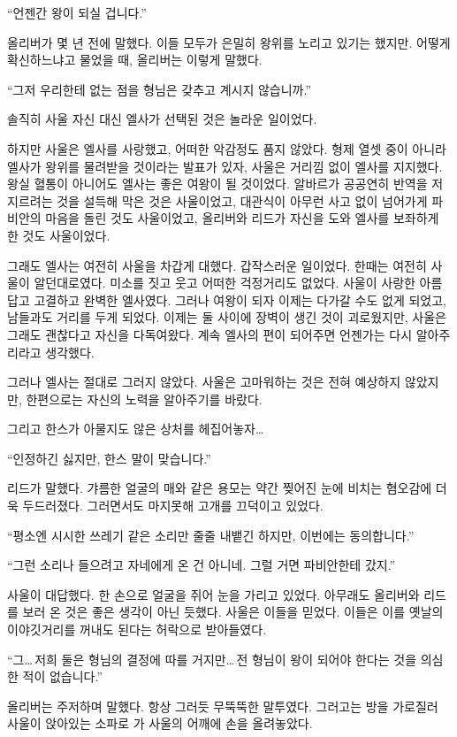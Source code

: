 ``언젠간 왕이 되실 겁니다.''

올리버가 몇 년 전에 말했다. 이들 모두가 은밀히 왕위를 노리고 있기는 했지만. 어떻게 확신하느냐고 물었을 때, 올리버는 이렇게 말했다.

``그저 우리한테 없는 점을 형님은 갖추고 계시지 않습니까.''

솔직히 사울 자신 대신 엘사가 선택된 것은 놀라운 일이었다.

하지만 사울은 엘사를 사랑했고, 어떠한 악감정도 품지 않았다. 형제 열셋 중이 아니라 엘사가 왕위를 물려받을 것이라는 발표가 있자, 사울은 거리낌 없이 엘사를 지지했다. 왕실 혈통이 아니어도 엘사는 좋은 여왕이 될 것이었다. 알바르가 공공연히 반역을 저지르려는 것을 설득해 막은 것은 사울이었고, 대관식이 아무런 사고 없이 넘어가게 파비안의 마음을 돌린 것도 사울이었고, 올리버와 리드가 자신을 도와 엘사를 보좌하게 한 것도 사울이었다.

그래도 엘사는 여전히 사울을 차갑게 대했다. 갑작스러운 일이었다. 한때는 여전히 사울이 알던대로였다. 미소를 짓고 웃고 어떠한 걱정거리도 없었다. 사울이 사랑한 아름답고 고결하고 완벽한 엘사였다. 그러나 여왕이 되자 이제는 다가갈 수도 없게 되었고, 남들과도 거리를 두게 되었다. 이제는 둘 사이에 장벽이 생긴 것이 괴로웠지만, 사울은 그래도 괜찮다고 자신을 다독여왔다. 계속 엘사의 편이 되어주면 언젠가는 다시 알아주리라고 생각했다.

그러나 엘사는 절대로 그러지 않았다. 사울은 고마워하는 것은 전혀 예상하지 않았지만, 한편으로는 자신의 노력을 알아주기를 바랐다.

그리고 한스가 아물지도 않은 상처를 헤집어놓자\ldots

``인정하긴 싫지만, 한스 말이 맞습니다.''

리드가 말했다. 갸름한 얼굴의 매와 같은 용모는 약간 찢어진 눈에 비치는 혐오감에 더욱 두드러졌다. 그러면서도 마지못해 고개를 끄덕이고 있었다.

``평소엔 시시한 쓰레기 같은 소리만 줄줄 내뱉긴 하지만, 이번에는 동의합니다.''

``그런 소리나 들으려고 자네에게 온 건 아니네. 그럴 거면 파비안한테 갔지.''

사울이 대답했다. 한 손으로 얼굴을 쥐어 눈을 가리고 있었다. 아무래도 올리버와 리드를 보러 온 것은 좋은 생각이 아닌 듯했다. 사울은 이들을 믿었다. 이들은 이를 옛날의 이야깃거리를 꺼내도 된다는 허락으로 받아들였다.

``그\ldots\,저희 둘은 형님의 결정에 따를 거지만\ldots\,전 형님이 왕이 되어야 한다는 것을 의심한 적이 없습니다.''

올리버는 주저하며 말했다. 항상 그러듯 무뚝뚝한 말투였다. 그러고는 방을 가로질러 사울이 앉아있는 소파로 가 사울의 어깨에 손을 올려놓았다.

